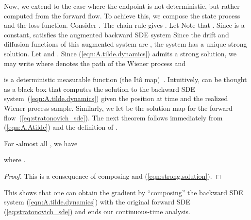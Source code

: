 \documentclass[twoside]{article}
\begin{document}
Now, we extend to the case where the endpoint is not deterministic, but rather computed from the forward flow.
To achieve this, we compose the state process and the loss function. 
Consider . 
The chain rule gives . 
Let
Note that . 
Since  is a constant,  satisfies the augmented backward SDE system
Since the drift and diffusion functions of this augmented system are , the system has a unique strong solution.
Let  and .
Since (\ref{eqn:A.tilde.dynamics}) admits a strong solution, we may write
where  denotes the path of the Wiener process and

is a deterministic measurable function (the {It\^{o} map})~\cite[Chapter V, Definition 10.9]{rogers2000diffusions2}. Intuitively,  can be thought as a black box that computes the solution to the backward SDE system~(\ref{eqn:A.tilde.dynamics}) given the position  at time  and the realized Wiener process sample. Similarly, we let  be the solution map for the forward flow~(\ref{eq:stratonovich_sde}). The next theorem follows immediately from (\ref{eqn:A.Atilde}) and the definition of .
\begin{theo} \label{thm:adjoint}
For -almost all , we have

where .
\end{theo}
\begin{proof}
This is a consequence of composing  and (\ref{eqn:strong.solution}).
\end{proof}
This shows that one can obtain the gradient by ``composing'' the backward SDE system (\ref{eqn:A.tilde.dynamics}) with the original forward SDE (\ref{eq:stratonovich_sde}) and ends our continuous-time analysis.
\end{document}
